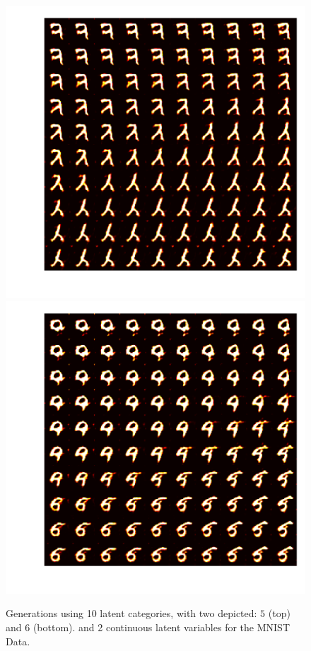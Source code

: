 \documentclass{article}
\begin{document}
\begin{figure}[h]
\centering
  \includegraphics[]{figures/samples_zk_6.png}
  \includegraphics[]{figures/samples_zk_7.png}
  \caption{Generations using 10 latent categories, with two depicted: $5$ (top) and $6$ (bottom). and 2 continuous latent variables for the MNIST Data.}
\end{figure}\label{MNISTg}
\end{document}
